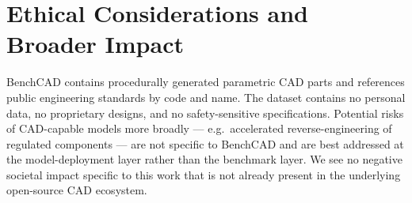 \clearpage
\section{Ethical Considerations and Broader Impact}
\label{app:ethics}

BenchCAD contains procedurally generated parametric CAD parts and references public engineering standards by code and name.
The dataset contains no personal data, no proprietary designs, and no safety-sensitive specifications.
Potential risks of CAD-capable models more broadly --- e.g.\ accelerated reverse-engineering of regulated components --- are not specific to BenchCAD and are best addressed at the model-deployment layer rather than the benchmark layer.
We see no negative societal impact specific to this work that is not already present in the underlying open-source CAD ecosystem.
